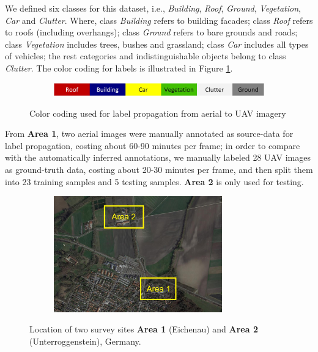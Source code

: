We defined six classes for this dataset, i.e., \textit{Building}, \textit{Roof}, \textit{Ground}, \textit{Vegetation}, \textit{Car} and \textit{Clutter}. Where, class \textit{Building} refers to building facades; class \textit{Roof} refers to roofs (including overhangs); class \textit{Ground} refers to bare grounds and roads; class \textit{Vegetation} includes trees, bushes and grassland; class \textit{Car} includes all types of vehicles; the rest categories and indistinguishable objects belong to class \textit{Clutter}. The color coding for labels is illustrated in Figure \ref{fig:colorbar_ei}.
\begin{figure}[htb]
    \centering
\begin{subfigure}{0.9\columnwidth}
  \centering
  \includegraphics[width=1\linewidth]{fig/eichenau/colorbar.JPG}
\end{subfigure} 
\caption{Color coding used for label propagation from aerial to UAV imagery}
       \label{fig:colorbar_ei}
\end{figure} 

From \textbf{Area 1}, two aerial images were manually annotated as source-data for label propagation, costing about 60-90 minutes per frame; in order to compare with the automatically inferred annotations, we manually labeled 28 UAV images as ground-truth data, costing about 20-30 minutes per frame, and then split them into 23 training samples and 5 testing samples. \textbf{Area 2} is only used for testing.

\begin{figure}[htb]
    \centering
       \begin{subfigure}[b]{1\linewidth}
	       \centering
			\includegraphics[width=0.8\textwidth]{fig/eichenau/site.JPG}
       \end{subfigure}
       \caption{Location of two survey sites \textbf{Area 1} (Eichenau) and \textbf{Area 2} (Unterroggenstein), Germany.}
       \label{fig:site}
\end{figure} 

